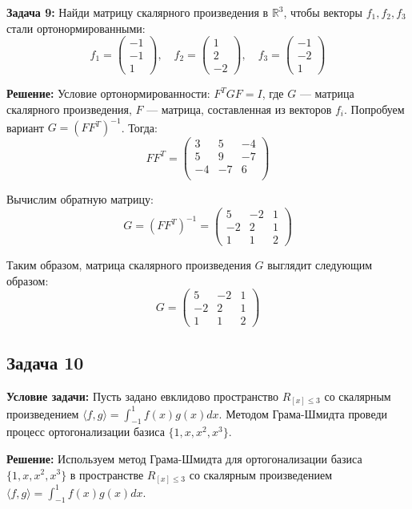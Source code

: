 \documentclass[a4paper,12pt]{article}
\begin{document}
\vspace{1cm}

\textbf{Задача 9:}
Найди матрицу скалярного произведения в $\mathbb{R}^3$, чтобы векторы $f_1, f_2, f_3$ стали ортонормированными:
\[
f_1 = \begin{pmatrix}
-1 \\ -1 \\ 1
\end{pmatrix}, \quad
f_2 = \begin{pmatrix}
1 \\ 2 \\ -2
\end{pmatrix}, \quad
f_3 = \begin{pmatrix}
-1 \\ -2 \\ 1
\end{pmatrix}
\]

\textbf{Решение:}
Условие ортонормированности: $F^T G F = I$, где $G$ — матрица скалярного произведения, $F$ — матрица, составленная из векторов $f_i$.
Попробуем вариант $G = (F F^T)^{-1}$. Тогда:
\[
F F^T = \begin{pmatrix}
3 & 5 & -4 \\
5 & 9 & -7 \\
-4 & -7 & 6 \\
\end{pmatrix}
\]

Вычислим обратную матрицу:
\[
G = (F F^T)^{-1} = \begin{pmatrix}
5 & -2 & 1 \\
-2 & 2 & 1 \\
1 & 1 & 2
\end{pmatrix}
\]

Таким образом, матрица скалярного произведения $G$ выглядит следующим образом:
\[
G = \begin{pmatrix}
5 & -2 & 1 \\
-2 & 2 & 1 \\
1 & 1 & 2
\end{pmatrix}
\]

\subsection{Задача 10}
\textbf{Условие задачи:} Пусть задано евклидово пространство $R_{[x] \leq 3}$ со скалярным произведением $\langle f, g \rangle = \int_{-1}^{1} f(x) g(x) dx$. Методом Грама-Шмидта проведи процесс ортогонализации базиса $\{1, x, x^2, x^3\}$.

\textbf{Решение:}
Используем метод Грама-Шмидта для ортогонализации базиса $\{1, x, x^2, x^3\}$ в пространстве $R_{[x] \leq 3}$ со скалярным произведением $\langle f, g \rangle = \int_{-1}^{1} f(x) g(x) dx$.
\end{document}
